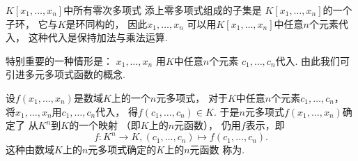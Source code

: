 \(K[x_1,\dotsc,x_n]\)中所有零次多项式
添上零多项式组成的子集是
\(K[x_1,\dotsc,x_n]\)的一个子环，
它与\(K\)是环同构的，
因此\(x_1,\dotsc,x_n\)
可以用\(K[x_1,\dotsc,x_n]\)中任意\(n\)个元素代入，
这种代入是保持加法与乘法运算.

特别重要的一种情形是：
\(x_1,\dotsc,x_n\)
用\(K\)中任意\(n\)个元素
\(c_1,\dotsc,c_n\)代入.
由此我们可引进多元多项式函数的概念.

设\(f(x_1,\dotsc,x_n)\)是数域\(K\)上的一个\(n\)元多项式，
对于\(K\)中任意\(n\)个元素\(c_1,\dotsc,c_n\)，
将\(x_1,\dotsc,x_n\)用\(c_1,\dotsc,c_n\)代入，
得\(f(c_1,\dotsc,c_n) \in K\).
于是\(n\)元多项式\(f(x_1,\dotsc,x_n)\)确定了
从\(K^n\)到\(K\)的一个映射
（即\(K\)上的\(n\)元函数），
仍用\(f\)表示，即\[
	f\colon
	K^n \to K,
	(c_1,\dotsc,c_n)
	\mapsto
	f(c_1,\dotsc,c_n).
\]
这种由数域\(K\)上的\(n\)元多项式确定的\(K\)上的\(n\)元函数
称为.
